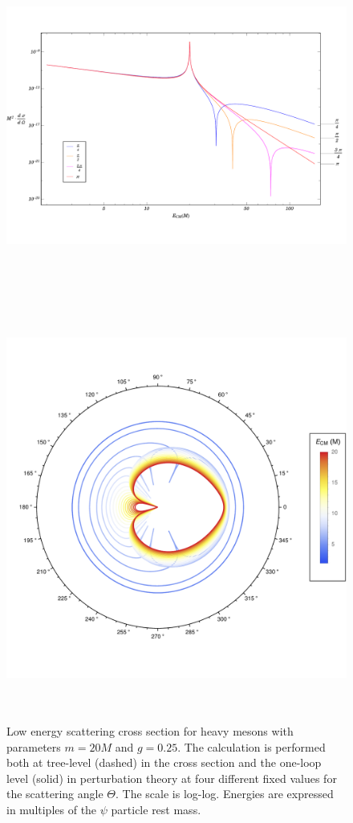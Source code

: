\documentclass[12pt]{extarticle}
\begin{document}
\begin{figure}
\begin{center}
\vspace*{-2.5cm}
\includegraphics[width=15cm, height=11cm]{HighMass-UnStableMeson-HighEnergy}
\vspace*{-0.5cm}
\caption{Low energy scattering cross section for heavy mesons with parameters $m = 20 M$ and $g = 0.25$. The calculation is performed both at tree-level (dashed) in the cross section and the one-loop level (solid) in perturbation theory at four different fixed values for the scattering angle $\Theta$. The scale is log-log. Energies are expressed in multiples of the $\psi$ particle rest mass.} 
\label{HighMassUnStabHighEnergy}
\vspace*{-0.5cm}
\includegraphics[width=14cm, height=14cm]{UnStableMeson-LowEnergy-Polar}

\end{center}
\end{figure}
\end{document}
